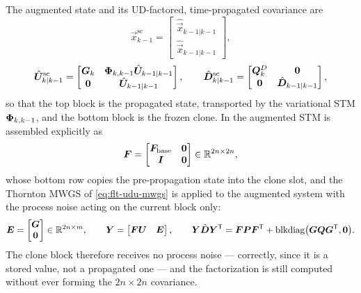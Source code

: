 The augmented state and its UD-factored, time-propagated covariance are
\citep[Ch.~6.2.1, Eqs.~6.18--6.23]{iiyama2026thesis}
\begin{equation}
  \label{eq:flt-sc-state}
  \vec{x}^{\mathrm{sc}}_{k-1}
  = \begin{bmatrix}
      \hat{\vec{x}}_{k-1|k-1} \\ \hat{\vec{x}}_{k-1|k-1}
    \end{bmatrix},
\end{equation}
\begin{equation}
  \label{eq:flt-sc-ud}
  \hat{\bm{U}}^{\mathrm{sc}}_{k|k-1}
  = \begin{bmatrix}
      \bm{G}_k & \bm{\Phi}_{k,k-1}\hat{\bm{U}}_{k-1|k-1} \\
      \bm{0}   & \hat{\bm{U}}_{k-1|k-1}
    \end{bmatrix},
  \qquad
  \hat{\bm{D}}^{\mathrm{sc}}_{k|k-1}
  = \begin{bmatrix}
      \bm{Q}^{D}_k & \bm{0} \\
      \bm{0}       & \hat{\bm{D}}_{k-1|k-1}
    \end{bmatrix} ,
\end{equation}
so that the top block is the propagated state, transported by the variational
STM $\bm{\Phi}_{k,k-1}$, and the bottom block is the frozen clone. In \lupnt{}
the augmented STM is assembled explicitly as
\begin{equation}
  \label{eq:flt-sc-stm}
  \bm{F} =
  \begin{bmatrix}
    \bm{F}_{\text{base}} & \bm{0} \\
    \bm{I}               & \bm{0}
  \end{bmatrix}
  \in \mathbb{R}^{2n \times 2n} ,
\end{equation}
whose bottom row copies the pre-propagation state into the clone slot, and the
Thornton MWGS of \cref{eq:flt-udu-mwgs} is applied to the augmented system
with the process noise acting on the current block only:
\begin{equation}
  \label{eq:flt-sc-mwgs}
  \bm{E} = \begin{bmatrix} \bm{G} \\ \bm{0} \end{bmatrix}
    \in \mathbb{R}^{2n \times m},
  \qquad
  \bm{Y} = \begin{bmatrix} \bm{F}\bm{U} & \bm{E} \end{bmatrix},
  \qquad
  \bm{Y}\tilde{\bm{D}}\bm{Y}^{\mathsf{T}}
  = \bm{F}\bm{P}\bm{F}^{\mathsf{T}}
    + \operatorname{blkdiag}\bigl(\bm{G}\bm{Q}\bm{G}^{\mathsf{T}}, \bm{0}\bigr) .
\end{equation}
The clone block therefore receives no process noise --- correctly, since it is
a stored value, not a propagated one --- and the factorization is still
computed without ever forming the $2n \times 2n$ covariance.

